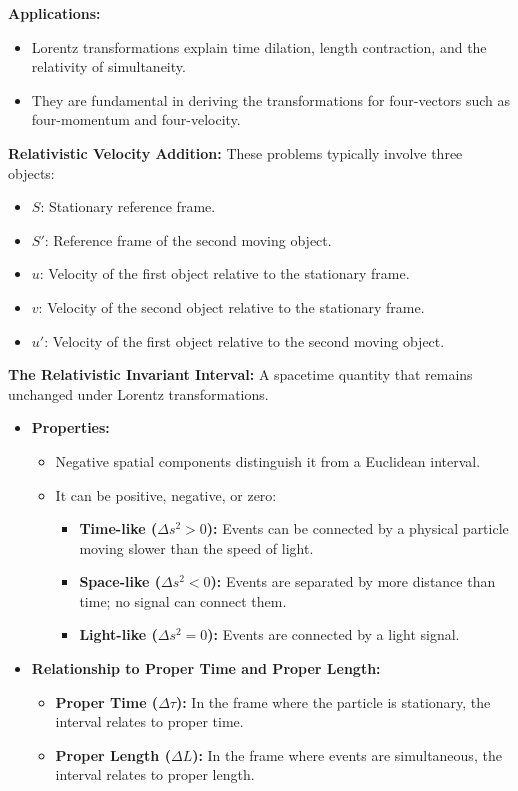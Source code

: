 \documentclass{article}
\newcommand{\conceptbox}[1]{\begin{tcolorbox}[colback=blue!10] #1 \end{tcolorbox}}
\begin{document}
{\textbf{Applications:}
\begin{itemize}
    \item Lorentz transformations explain time dilation, length contraction, and the relativity of simultaneity.
    \item They are fundamental in deriving the transformations for four-vectors such as four-momentum and four-velocity.
\end{itemize}
}


\conceptbox{
\textbf{Relativistic Velocity Addition:} 
These problems typically involve three objects:
\begin{itemize}
    \item $S$: Stationary reference frame.
    \item $S'$: Reference frame of the second moving object.
    \item $u$: Velocity of the first object relative to the stationary frame.
    \item $v$: Velocity of the second object relative to the stationary frame.
    \item $u'$: Velocity of the first object relative to the second moving object.
\end{itemize}
}

\conceptbox{
\textbf{The Relativistic Invariant Interval:} 
A spacetime quantity that remains unchanged under Lorentz transformations.

\begin{itemize}
    \item \textbf{Properties:}
    \begin{itemize}
        \item Negative spatial components distinguish it from a Euclidean interval.
        \item It can be positive, negative, or zero:
        \begin{itemize}
            \item \textbf{Time-like ($\Delta s^2 > 0$):} Events can be connected by a physical particle moving slower than the speed of light.
            \item \textbf{Space-like ($\Delta s^2 < 0$):} Events are separated by more distance than time; no signal can connect them.
            \item \textbf{Light-like ($\Delta s^2 = 0$):} Events are connected by a light signal.
        \end{itemize}
    \end{itemize}
    \item \textbf{Relationship to Proper Time and Proper Length:}
    \begin{itemize}
        \item \textbf{Proper Time ($\Delta \tau$):} In the frame where the particle is stationary, the interval relates to proper time.
        \item \textbf{Proper Length ($\Delta L$):} In the frame where events are simultaneous, the interval relates to proper length.
    \end{itemize}
\end{itemize}
}
\end{document}
